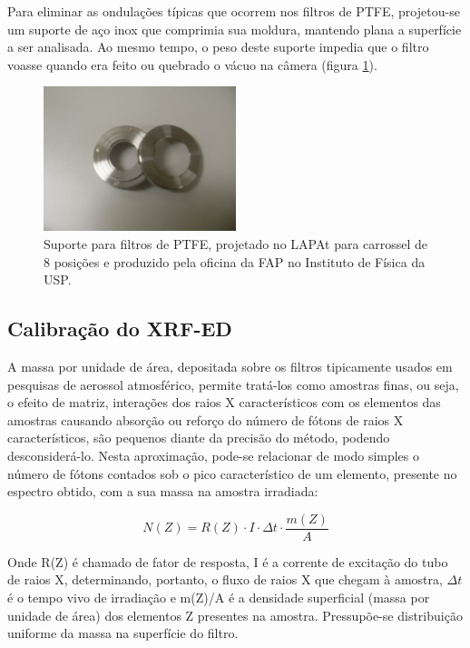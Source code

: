 Para eliminar as ondulações típicas que ocorrem nos filtros de PTFE, 
projetou-se um suporte de aço inox que comprimia sua moldura, mantendo plana 
a superfície a ser analisada. Ao mesmo tempo, o peso deste suporte impedia que 
o filtro voasse quando era feito ou quebrado o vácuo na câmera 
(figura \ref{fig:suporte8}).

\begin{figure}[H]
  \centering
  \includegraphics[width=0.5\textwidth]{../inputs/images/suporte8.jpg}
  \caption{Suporte para filtros de PTFE, projetado no LAPAt para carrossel de 
           8 posições e produzido pela oficina da FAP no 
           Instituto de Física da USP. \label{fig:suporte8}}
\end{figure}

\subsection{Calibração do XRF-ED}

A massa por unidade de área, depositada sobre os filtros tipicamente usados em 
pesquisas de aerossol atmosférico, permite tratá-los como amostras finas,
ou seja, o efeito de matriz, interações dos raios X característicos com os 
elementos das amostras causando absorção ou reforço do número de fótons de 
raios X característicos, são pequenos diante da precisão do método,
podendo desconsiderá-lo. Nesta aproximação, pode-se relacionar de modo 
simples o número de fótons contados sob o pico característico de um elemento, 
presente no espectro obtido, com a sua massa na amostra irradiada:

\begin{equation}
  \label{eq:contagem}
  N(Z) = R(Z) \cdot I \cdot \Delta t  \cdot \frac{m(Z)}{A}
\end{equation}

Onde R(Z) é chamado de fator de resposta, I é a corrente de excitação do tubo 
de raios X, determinando, portanto, o fluxo de raios X que chegam à amostra, 
$\Delta t$ é o tempo vivo de irradiação e m(Z)/A é a densidade superficial
(massa por unidade de área) dos elementos Z presentes na amostra. 
Pressupõe-se distribuição uniforme da massa na superfície do filtro.

